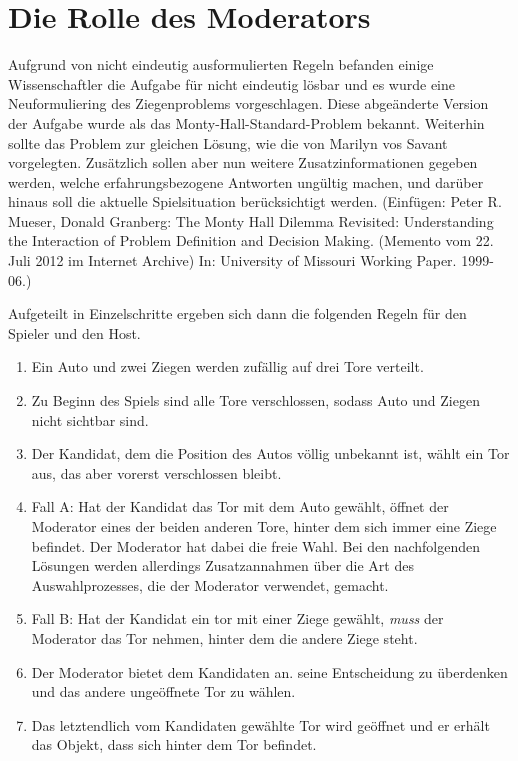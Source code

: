 \chapter{Die Rolle des Moderators}

Aufgrund von nicht eindeutig ausformulierten Regeln befanden einige Wissenschaftler die Aufgabe für nicht eindeutig lösbar und es wurde eine Neuformuliering des
Ziegenproblems vorgeschlagen. Diese abgeänderte Version der Aufgabe wurde als das Monty-Hall-Standard-Problem bekannt. Weiterhin sollte das Problem zur gleichen
Lösung, wie die von Marilyn vos Savant vorgelegten. Zusätzlich sollen aber nun weitere Zusatzinformationen gegeben werden, welche erfahrungsbezogene Antworten ungültig
machen, und darüber hinaus soll die aktuelle Spielsituation berücksichtigt werden. (Einfügen:  Peter R. Mueser, Donald Granberg: The Monty Hall Dilemma Revisited: Understanding the Interaction of Problem Definition and Decision Making. (Memento vom 22. Juli 2012 im Internet Archive) In: University of Missouri Working Paper. 1999-06.)

Aufgeteilt in Einzelschritte ergeben sich dann die folgenden Regeln für den Spieler und den Host.
\begin{enumerate}
    \item Ein Auto und zwei Ziegen werden zufällig auf drei Tore verteilt.
    \item Zu Beginn des Spiels sind alle Tore verschlossen, sodass Auto und Ziegen nicht sichtbar sind.
    \item Der Kandidat, dem die Position des Autos völlig unbekannt ist, wählt ein Tor aus, das aber vorerst verschlossen bleibt.
    \item Fall A: Hat der Kandidat das Tor mit dem Auto gewählt, öffnet der Moderator eines der beiden anderen Tore, hinter dem sich immer eine Ziege befindet. 
    Der Moderator hat dabei die freie Wahl. Bei den nachfolgenden Lösungen werden allerdings Zusatzannahmen über die Art des Auswahlprozesses, die der Moderator
    verwendet, gemacht.
    \item Fall B: Hat der Kandidat ein tor mit einer Ziege gewählt, \textit{muss} der Moderator das Tor nehmen, hinter dem die andere Ziege steht.
    \item Der Moderator bietet dem Kandidaten an. seine Entscheidung zu überdenken und das andere ungeöffnete Tor zu wählen.
    \item Das letztendlich vom Kandidaten gewählte Tor wird geöffnet und er erhält das Objekt, dass sich hinter dem Tor befindet.
\end{enumerate}

